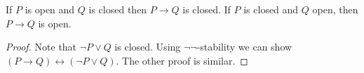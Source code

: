 %
%
\begin{lemma}\label{ImplicationOpenClosed}
  If $P$ is open %
  and $Q$ is closed %
  then $P\to Q$ is closed. %
  If $P$ is closed and $Q$ open, then $P\to Q$ is open. 
\end{lemma}
\begin{proof}
  Note that $\neg P \vee Q$ is closed. Using $\neg\neg$-stability
  we can show $(P\to Q) \leftrightarrow (\neg P \vee Q)$. 
  The other proof is similar. 
\end{proof}
%

